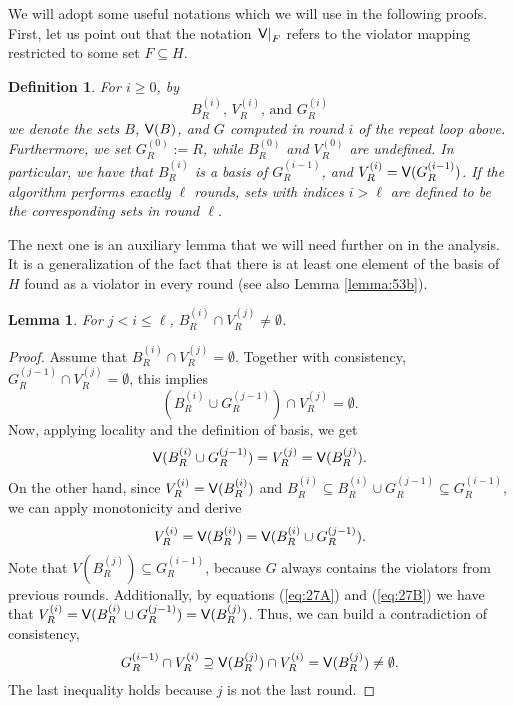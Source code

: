 \documentclass[12pt]{article}
\def\Violators{{\sf V}}
\newtheorem{lemma2}[theorem2]{Lemma}
\newenvironment{lemma}{\begin{lemma2}}{\end{lemma2}}
\newtheorem{definition2}[theorem2]{Definition}
\newenvironment{definition}{\begin{definition2}}{\end{definition2}}
\theoremstyle{remark}
\begin{document}
    We will adopt some useful notations which we will use in the following proofs.
    First, let us point out that the notation $\left.\Violators\right|_{F}$ refers to the violator mapping
restricted to some set $F\subseteq H$.
    \begin{definition}
    \label{def:intermediatesets}
    For $i\geq 0$, by
    \[
    	B_{R}^{(i)}\text{, } V_{R}^{(i)}\text{, and } G_{R}^{(i)}
    \]
    we denote the sets $B$, $\Violators(B)$, and $G$ computed in round $i$ of the
    repeat loop above.
    Furthermore, we set $G_{R}^{(0)}:= R$, while $B_{R}^{(0)}$
    and $V_{R}^{(0)}$  are undefined. In particular, we have that
   $B_{R}^{(i)}$ is a basis of $G_{R}^{(i-1)}$, and  $V_{R}^{(i)} = \Violators(G_{R}^{(i-1)})$.
    If the algorithm performs exactly $\ell$ rounds, sets with indices $i> \ell$ are defined
    to be the corresponding sets in round $\ell$.
    \end{definition}
    
    
    The next one is an auxiliary lemma that we will need further on in the analysis. It is a 
generalization
    of the fact that there is at least one element of the basis of $H$ found as a violator in every 
round (see also
    Lemma \ref{lemma:53b}).
    \begin{lemma}
    \label{lemma:53}
    	For $j<i\leq \ell$, $B_{R}^{(i)}\cap V_{R}^{(j)} \neq \emptyset$.
    \end{lemma}
    \begin{proof}
    Assume that $B_{R}^{(i)}\cap V_{R}^{(j)} = \emptyset$. Together with consistency,
    $G_{R}^{(j-1)} \cap V_{R}^{(j)} = \emptyset$, this implies
    \[
    	(B_{R}^{(i)} \cup G_{R}^{(j-1)}) \cap V_{R}^{(j)} = \emptyset.
    \]
   Now, applying locality and the definition of basis, we get
   \begin{equation}
   \label{eq:27A}
   	\Violators(B_{R}^{(i)}\cup G_{R}^{(j-1)}) = V_{R}^{(j)} = \Violators(B_{R}^{(j)}).
   \end{equation}
   On the other  hand, since $V_{R}^{(i)} = \Violators(B_{R}^{(i)})$ and
   $B_{R}^{(i)}\subseteq B_{R}^{(i)} \cup G_{R}^{(j-1)}\subseteq G_{R}^{(i-1)}$,
   we can apply monotonicity and derive
   \begin{equation}
   \label{eq:27B}
   V_{R}^{(i)}=\Violators(B_{R}^{(i)}) = \Violators(B_{R}^{(i)} \cup G_{R}^{(j-1)}).
\end{equation}
   Note that $V(B_{R}^{(j)})\subseteq G_{R}^{(i-1)}$, because $G$ always contains the
   violators from previous rounds. Additionally, by equations (\ref{eq:27A}) and (\ref{eq:27B}) we have 
that
   $V_{R}^{(i)} = \Violators(B_{R}^{(i)}\cup G_R^{(j-1)}) = \Violators(B_{R}^{(j)})$.
   Thus, we can build a contradiction of consistency,
   \[
   	G_{R}^{(i-1)} \cap V_{R}^{(i)} \supseteq \Violators(B_{R}^{(j)}) \cap V_{R}^{(i)} = 
\Violators(B_{R}^{(j)}) \neq \emptyset.
   \]
   The last inequality holds because $j$ is not the last round.
    \end{proof}
    
\end{document}

